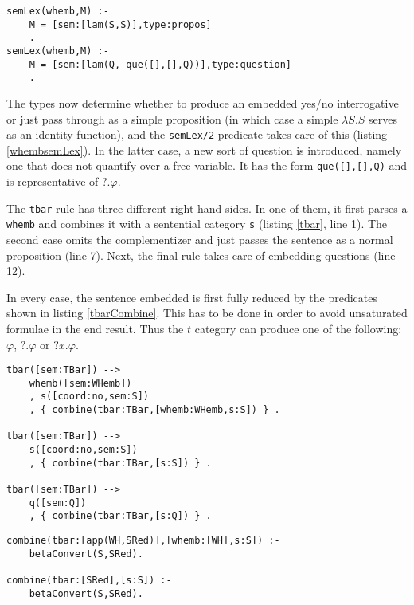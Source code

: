 \documentclass[notitlepage,twoside,a4paper]{scrreprt}
\newcommand{\code}[1]{\texttt{#1}} %
\theoremstyle{remark}
\theoremstyle{remark}
\theoremstyle{definition}
\theoremstyle{definition}
\begin{document}
\begin{lstlisting}[label=whembsemLex,caption={Semantic Rules for Complementizers},float]
semLex(whemb,M) :-
    M = [sem:[lam(S,S)],type:propos]
    .
semLex(whemb,M) :-
    M = [sem:[lam(Q, que([],[],Q))],type:question]
    .
\end{lstlisting}

The types now determine whether to produce an embedded yes/no
interrogative or just pass through as a simple proposition (in which case a
simple $\lambda S. S$ serves as an identity function), and the
\code{semLex/2} predicate takes care of this (listing \ref{whembsemLex}). In the
latter case, a new sort of question is introduced, namely one that does not
quantify over a free variable. It has the form \lstinline!que([],[],Q)! and is
representative of $?.\varphi$.

The \code{tbar} rule has three different right hand sides. 
In one of them, it first parses a \code{whemb} and combines it with a sentential
category \code{s} (listing \ref{tbar}, line 1). The second case omits the
complementizer and just passes the sentence as a normal proposition (line 7).
Next, the final rule takes care of embedding questions (line 12).

In every case, the sentence embedded is first fully reduced by the predicates
shown in listing \ref{tbarCombine}. This has to be done in order to avoid
unsaturated formulae in the end result. Thus the $\bar{t}$ category can   produce
one of the following: $\varphi$, $?.\varphi$ or $?x.\varphi$.

\begin{lstlisting}[label=tbar,caption={Semantic Rules for $\bar{t}$},float]
tbar([sem:TBar]) -->
    whemb([sem:WHemb])
    , s([coord:no,sem:S])
    , { combine(tbar:TBar,[whemb:WHemb,s:S]) } .

tbar([sem:TBar]) -->
    s([coord:no,sem:S])
    , { combine(tbar:TBar,[s:S]) } .
 
tbar([sem:TBar]) -->
    q([sem:Q])
    , { combine(tbar:TBar,[s:Q]) } .
\end{lstlisting}

\begin{lstlisting}[label=tbarCombine,caption={$\bar{t}$ is responsible for beta-converting the embedded sentence.},float]
combine(tbar:[app(WH,SRed)],[whemb:[WH],s:S]) :-
    betaConvert(S,SRed).

combine(tbar:[SRed],[s:S]) :-
    betaConvert(S,SRed).
\end{lstlisting}
\end{document}
